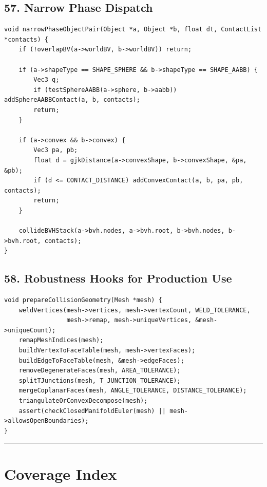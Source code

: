 \documentclass[10pt,letterpaper]{article}
\begin{document}
\subsection*{57. Narrow Phase Dispatch}

\begin{verbatim}
void narrowPhaseObjectPair(Object *a, Object *b, float dt, ContactList *contacts) {
    if (!overlapBV(a->worldBV, b->worldBV)) return;

    if (a->shapeType == SHAPE_SPHERE && b->shapeType == SHAPE_AABB) {
        Vec3 q;
        if (testSphereAABB(a->sphere, b->aabb)) addSphereAABBContact(a, b, contacts);
        return;
    }

    if (a->convex && b->convex) {
        Vec3 pa, pb;
        float d = gjkDistance(a->convexShape, b->convexShape, &pa, &pb);
        if (d <= CONTACT_DISTANCE) addConvexContact(a, b, pa, pb, contacts);
        return;
    }

    collideBVHStack(a->bvh.nodes, a->bvh.root, b->bvh.nodes, b->bvh.root, contacts);
}
\end{verbatim}


\subsection*{58. Robustness Hooks for Production Use}

\begin{verbatim}
void prepareCollisionGeometry(Mesh *mesh) {
    weldVertices(mesh->vertices, mesh->vertexCount, WELD_TOLERANCE,
                 mesh->remap, mesh->uniqueVertices, &mesh->uniqueCount);
    remapMeshIndices(mesh);
    buildVertexToFaceTable(mesh, mesh->vertexFaces);
    buildEdgeToFaceTable(mesh, &mesh->edgeFaces);
    removeDegenerateFaces(mesh, AREA_TOLERANCE);
    splitTJunctions(mesh, T_JUNCTION_TOLERANCE);
    mergeCoplanarFaces(mesh, ANGLE_TOLERANCE, DISTANCE_TOLERANCE);
    triangulateOrConvexDecompose(mesh);
    assert(checkClosedManifoldEuler(mesh) || mesh->allowsOpenBoundaries);
}
\end{verbatim}

\medskip\hrule\medskip


\clearpage
{}
\section*{Coverage Index}
\end{document}
